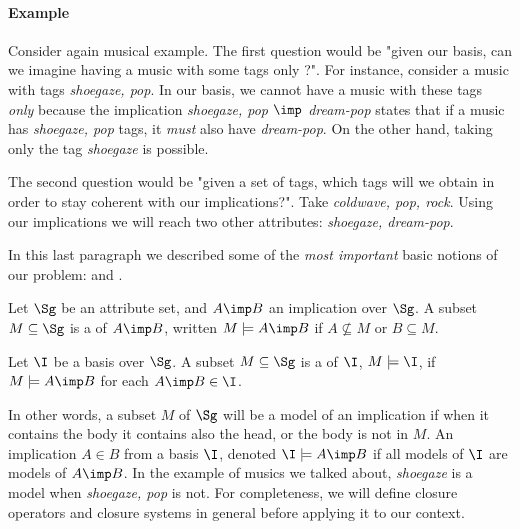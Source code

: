 \paragraph{Example} Consider again musical example. The first question would be 
"given our basis, can we imagine having a music with some tags only ?". For 
instance, consider a music with tags \textit{shoegaze, pop}. In our basis, we 
cannot have a music with these tags \textit{only} because the implication 
\textit{shoegaze, pop} $\imp$ \textit{dream-pop} states that if a music has 
\textit{shoegaze, pop} tags, it \textit{must} also have \textit{dream-pop}. On 
the other hand, taking only the tag \textit{shoegaze} is possible. 

The second question would be "given a set of tags, which tags will we obtain
in order to stay coherent with our implications?". Take \textit{coldwave, pop, 
rock}. Using our implications we will reach two other attributes: 
\textit{shoegaze, dream-pop}.

\vspace{1.2em}

In this last paragraph we described some of the \textit{most important} basic 
notions of our problem:  and .

\begin{definition} Let $\Sg$ be an attribute set, and
$A \imp B$ an implication over $\Sg$. A subset $M \subseteq \Sg$ is a 
 of $A \imp B$, written $M \models A \imp B$ if $A \nsubseteq M$ 
or $B \subseteq M$.

\end{definition}

\begin{definition} Let $\I$ be a basis over 
$\Sg$. A subset $M \subseteq \Sg$ is a  of $\I$, $M \models \I$, 
if $M \models A \imp B$ for each $A \imp B \in \I$.

\end{definition}

In other words, a subset $M$ of $\Sg$ will be a model of an implication if when 
it contains the body it contains also the head, or the body is not in $M$. An 
implication $A \in B$  from a basis $\I$, denoted $\I \models A 
\imp B$ if all models of $\I$ are models of $A \imp B$. In the example of 
musics we talked about, \textit{shoegaze} is a model when \textit{shoegaze, 
pop} is not. For completeness, we will define closure operators and closure 
systems in general before applying it to our context.


